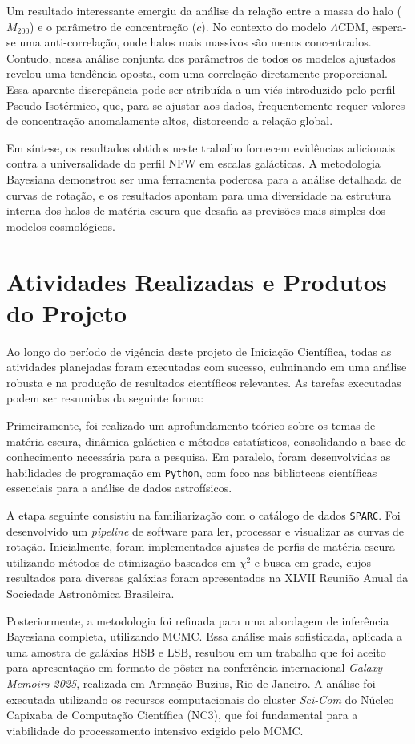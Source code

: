 \documentclass[a4paper]{article}
\begin{document}
Um resultado interessante emergiu da análise da relação entre a massa do halo ($M_{200}$) e o parâmetro de concentração ($c$). No contexto do modelo $\Lambda$CDM, espera-se uma anti-correlação, onde halos mais massivos são menos concentrados. Contudo, nossa análise conjunta dos parâmetros de todos os modelos ajustados revelou uma tendência oposta, com uma correlação diretamente proporcional. Essa aparente discrepância pode ser atribuída a um viés introduzido pelo perfil Pseudo-Isotérmico, que, para se ajustar aos dados, frequentemente requer valores de concentração anomalamente altos, distorcendo a relação global.

Em síntese, os resultados obtidos neste trabalho fornecem evidências adicionais contra a universalidade do perfil NFW em escalas galácticas. A metodologia Bayesiana demonstrou ser uma ferramenta poderosa para a análise detalhada de curvas de rotação, e os resultados apontam para uma diversidade na estrutura interna dos halos de matéria escura que desafia as previsões mais simples dos modelos cosmológicos.

\section{Atividades Realizadas e Produtos do Projeto}
Ao longo do período de vigência deste projeto de Iniciação Científica, todas as atividades planejadas foram executadas com sucesso, culminando em uma análise robusta e na produção de resultados científicos relevantes. As tarefas executadas podem ser resumidas da seguinte forma:

Primeiramente, foi realizado um aprofundamento teórico sobre os temas de matéria escura, dinâmica galáctica e métodos estatísticos, consolidando a base de conhecimento necessária para a pesquisa. Em paralelo, foram desenvolvidas as habilidades de programação em \texttt{Python}, com foco nas bibliotecas científicas essenciais para a análise de dados astrofísicos.

A etapa seguinte consistiu na familiarização com o catálogo de dados \texttt{SPARC}. Foi desenvolvido um \textit{pipeline} de software para ler, processar e visualizar as curvas de rotação. Inicialmente, foram implementados ajustes de perfis de matéria escura utilizando métodos de otimização baseados em $\chi^2$ e busca em grade, cujos resultados para diversas galáxias foram apresentados na XLVII Reunião Anual da Sociedade Astronômica Brasileira.

Posteriormente, a metodologia foi refinada para uma abordagem de inferência Bayesiana completa, utilizando MCMC. Essa análise mais sofisticada, aplicada a uma amostra de galáxias HSB e LSB, resultou em um trabalho que foi aceito para apresentação em formato de pôster na conferência internacional \textit{Galaxy Memoirs 2025}, realizada em Armação Buzius, Rio de Janeiro. A análise foi executada utilizando os recursos computacionais do cluster \textit{Sci-Com} do Núcleo Capixaba de Computação Científica (NC3), que foi fundamental para a viabilidade do processamento intensivo exigido pelo MCMC.
\end{document}
